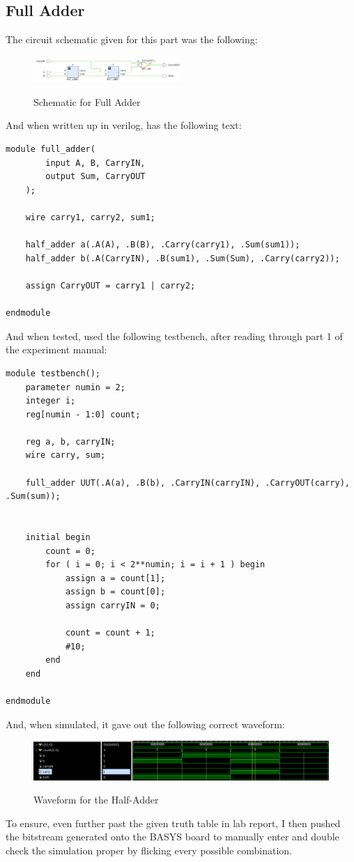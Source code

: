 \subsection{Full Adder}
The circuit schematic given for this part was the following:
\begin{figure}[!htbp]
    \centering
    \caption{Schematic for Full Adder}
    \includegraphics[width=0.5\textwidth]{part-1-full-schem.png}
    \label{Full Adder Schematic}
\end{figure}
And when written up in verilog, has the following text:
\begin{lstlisting}[caption={test}, label={label}, style=Verilog]
module full_adder(
        input A, B, CarryIN,
        output Sum, CarryOUT
    );
    
    wire carry1, carry2, sum1;
    
    half_adder a(.A(A), .B(B), .Carry(carry1), .Sum(sum1));
    half_adder b(.A(CarryIN), .B(sum1), .Sum(Sum), .Carry(carry2));
    
    assign CarryOUT = carry1 | carry2; 
    
endmodule
\end{lstlisting}
And when tested, used the following testbench, after reading through part 1 of the experiment manual:
\begin{lstlisting}[caption={test}, label={label}, style=Verilog]
module testbench();
    parameter numin = 2;
    integer i;
    reg[numin - 1:0] count;
    
    reg a, b, carryIN;
    wire carry, sum;
    
    full_adder UUT(.A(a), .B(b), .CarryIN(carryIN), .CarryOUT(carry), .Sum(sum));

    
    initial begin
        count = 0;
        for ( i = 0; i < 2**numin; i = i + 1 ) begin
            assign a = count[1];
            assign b = count[0];
            assign carryIN = 0;
            
            count = count + 1;
            #10;
        end
    end
    
endmodule
\end{lstlisting}
And, when simulated, it gave out the following correct waveform:
\begin{figure}[!htbp]
    \centering
    \caption{Waveform for the Half-Adder}
    \includegraphics[width=1\textwidth]{part-1-full-waveform.png}
    \label{Figure 2}
\end{figure}
To ensure, even further past the given truth table in lab report, I then pushed the bitstream generated onto the BASYS board to manually enter and double check the simulation proper by flicking every possible combination.
\newpage


